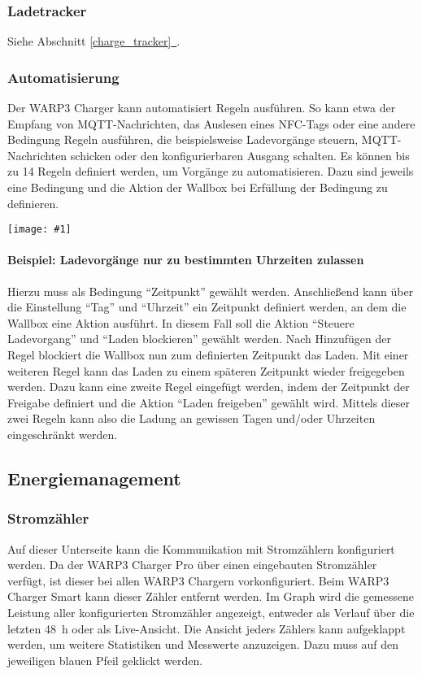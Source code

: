 \documentclass[a4paper,10pt]{article}
\newcommand{\gfx}[1]{\texttt{[image: \#1]}}
\newcommand*{\fullref}[1]{Abschnitt \hyperref[{#1}]{\ref*{#1}~\nameref*{#1}}}
\begin{document}
\begin{multicols*}{2}
    \subsubsection{Ladetracker}
    Siehe \fullref{charge_tracker}.

    \subsubsection{Automatisierung}
    Der WARP3 Charger kann automatisiert Regeln ausführen. So kann etwa
    der Empfang von MQTT-Nachrichten, das Auslesen eines NFC-Tags oder eine andere Bedingung
    Regeln ausführen, die beispielsweise Ladevorgänge steuern, MQTT-Nachrichten schicken oder
    den konfigurierbaren Ausgang schalten.
    Es können bis zu 14 Regeln definiert werden, um Vorgänge zu automatisieren.
    Dazu sind jeweils eine Bedingung und die Aktion der Wallbox bei Erfüllung der
    Bedingung zu definieren.

    \gfx{./img_warp3/resized/web_automation}

    \paragraph{Beispiel: Ladevorgänge nur zu bestimmten Uhrzeiten zulassen}
    Hierzu muss als Bedingung \enquote{Zeitpunkt} gewählt werden. Anschließend
    kann über die Einstellung \enquote{Tag} und \enquote{Uhrzeit} ein Zeitpunkt definiert werden, an
    dem die Wallbox eine Aktion ausführt. In diesem Fall soll die Aktion
    \enquote{Steuere Ladevorgang} und \enquote{Laden blockieren} gewählt werden. Nach
    Hinzufügen der Regel blockiert die Wallbox nun zum definierten
    Zeitpunkt das Laden. Mit einer weiteren Regel kann
    das Laden zu einem späteren Zeitpunkt wieder freigegeben werden. Dazu kann
    eine zweite Regel eingefügt werden, indem der Zeitpunkt der Freigabe definiert und die Aktion
    \enquote{Laden freigeben} gewählt wird. Mittels dieser zwei Regeln kann also die Ladung
    an gewissen Tagen und/oder Uhrzeiten eingeschränkt werden.


	\subsection{Energiemanagement}\label{energiemanagement}

	\subsubsection{Stromzähler}\label{meter}
	\vspace*{-0.1cm}
    Auf dieser Unterseite kann die Kommunikation mit Stromzählern konfiguriert werden.
    Da der WARP3 Charger Pro über einen eingebauten Stromzähler verfügt, ist dieser bei allen WARP3 Chargern vorkonfiguriert.
    Beim WARP3 Charger Smart kann dieser Zähler entfernt werden.
    Im Graph wird die gemessene Leistung aller konfigurierten Stromzähler
	angezeigt, entweder als Verlauf über die letzten \SI{48}{\hour} oder als
	Live-Ansicht. Die Ansicht jeders Zählers kann aufgeklappt werden, um weitere Statistiken und Messwerte anzuzeigen. Dazu muss auf den
	jeweiligen blauen Pfeil geklickt werden.


\end{multicols*}
\end{document}
